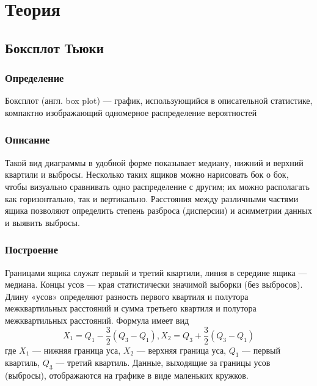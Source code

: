 \documentclass[a4paper]{article}
\begin{document}
\section {Теория}
\subsection{Боксплот Тьюки}
	\subsubsection{Определение}
	\noindent Боксплот (англ. box plot) — график, использующийся в описательной статистике, компактно изображающий одномерное распределение вероятностей
	
	\subsubsection{Описание}
	\noindent Такой вид диаграммы в удобной форме показывает медиану, нижний и верхний квартили и выбросы. Несколько таких ящиков можно нарисовать бок о бок, чтобы визуально сравнивать одно распределение с другим; их можно располагать как горизонтально, так и вертикально. Расстояния между различными частями ящика позволяют определить степень разброса (дисперсии) и асимметрии данных и выявить выбросы.
	
	\subsubsection{Построение}
	\noindent Границами ящика служат первый и третий квартили, линия в середине ящика — медиана. Концы усов — края статистически значимой выборки (без выбросов). Длину «усов» определяют разность первого квартиля и полутора межквартильных расстояний и сумма третьего квартиля и полутора межквартильных расстояний. Формула имеет вид
	\begin{equation}
	\label{mouns}
	{X_1 = Q_1-} \frac{3}{2}{(Q_3 - Q_1)},   {X_2 = Q_3+} \frac{3}{2}{(Q_3 - Q_1)}
	\end{equation}
	где $X_1$ — нижняя граница уса, $X_2$ — верхняя граница уса, $Q_1$ — первый квартиль, $Q_3$ — третий квартиль. Данные, выходящие за границы усов (выбросы), отображаются на графике в виде маленьких кружков.
	
	
\end{document}
